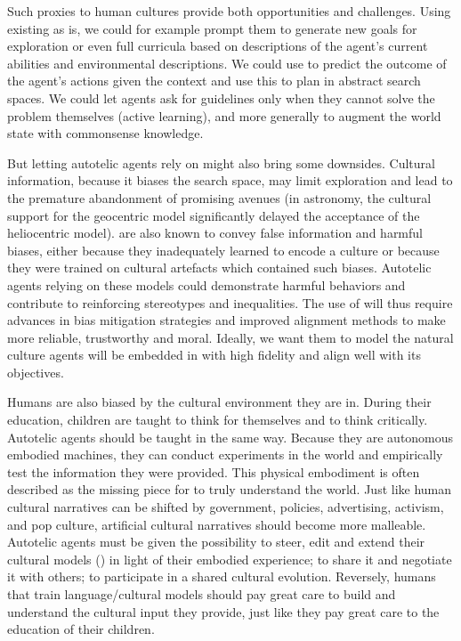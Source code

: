 Such proxies to human cultures provide both opportunities and challenges. Using existing \llms as is, we could for example prompt them to generate new goals for exploration or even full curricula based on descriptions of the agent's current abilities and environmental descriptions. We could use \llms to predict the outcome of the agent's actions given the context and use this to plan in abstract search spaces. We could let agents ask \llms for guidelines only when they cannot solve the problem themselves (active learning), and more generally to augment the world state with commonsense knowledge.

But letting autotelic agents rely on \llms might also bring some downsides. Cultural information, because it biases the search space, may limit exploration and lead to the premature abandonment of promising avenues\cite{bonawitz2011Double} (\eg in astronomy, the cultural support for the geocentric model significantly delayed the acceptance of the heliocentric model). \llms are also known to convey false information and harmful biases, either because they inadequately learned to encode a culture or because they were trained on cultural artefacts which contained such biases.\cite{shah-etal-2020-predictive,pmlr-v139-liang21a,weidinger2021ethical,bender2021dangers} Autotelic agents relying on these models could demonstrate harmful behaviors and contribute to reinforcing stereotypes and inequalities. The use of \llms will thus require advances in bias mitigation strategies\cite{pmlr-v139-liang21a,bender2021dangers} and improved alignment methods to make \llms more reliable, trustworthy and moral. Ideally, we want them to model the natural culture agents will be embedded in with high fidelity and align well with its objectives.

Humans are also biased by the cultural environment they are in. During their education, children are taught to think for themselves and to think critically. Autotelic agents should be taught in the same way. Because they are autonomous embodied machines, they can conduct experiments in the world and empirically test the information they were provided. This physical embodiment is often described as the missing piece for \llms to truly understand the world.\cite{bisk2020experience} Just like human cultural narratives can be shifted by government, policies, advertising, activism, and pop culture, artificial cultural narratives should become more malleable. Autotelic agents must be given the possibility to steer, edit and extend their cultural models (\ie \llms) in light of their embodied experience; to share it and negotiate it with others; \ie to participate in a shared cultural evolution. Reversely, humans that train language/cultural models should pay great care to build and understand the cultural input they provide, just like they pay great care to the education of their children. 

